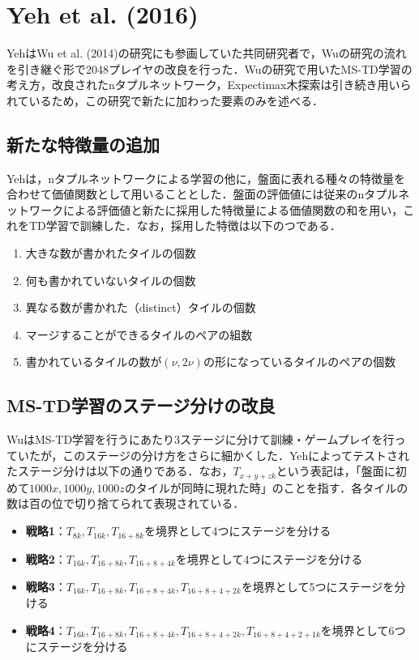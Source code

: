 \documentclass{suribt}
\begin{document}
\section{Yeh et al. (2016)}
YehはWu et al. (2014)の研究にも参画していた共同研究者で，Wuの研究の流れを引き継ぐ形で2048プレイヤの改良を行った．Wuの研究で用いたMS-TD学習の考え方，改良されたnタプルネットワーク，Expectimax木探索は引き続き用いられているため，この研究で新たに加わった要素のみを述べる．

\subsection{新たな特徴量の追加}
Yehは，nタプルネットワークによる学習の他に，盤面に表れる種々の特徴量を合わせて価値関数として用いることとした．盤面の評価値には従来のnタプルネットワークによる評価値と新たに採用した特徴量による価値関数の和を用い，これをTD学習で訓練した．なお，採用した特徴は以下のつである．

\begin{enumerate}
\item 大きな数が書かれたタイルの個数
\item 何も書かれていないタイルの個数
\item 異なる数が書かれた（distinct）タイルの個数
\item マージすることができるタイルのペアの組数
\item 書かれているタイルの数が$({\nu}, 2{\nu})$の形になっているタイルのペアの個数
\end{enumerate}

\subsection{MS-TD学習のステージ分けの改良}
WuはMS-TD学習を行うにあたり3ステージに分けて訓練・ゲームプレイを行っていたが，このステージの分け方をさらに細かくした．Yehによってテストされたステージ分けは以下の通りである．なお，$T_{x+y+zk}$という表記は，「盤面に初めて$1000x, 1000y, 1000z$のタイルが同時に現れた時」のことを指す．各タイルの数は百の位で切り捨てられて表現されている．

\begin{itemize}
\item \textbf{戦略1}：$T_{8k}, T_{16k}, T_{16+8k}$を境界として4つにステージを分ける
\item \textbf{戦略2}：$T_{16k}, T_{16+8k}, T_{16+8+4k}$を境界として4つにステージを分ける
\item \textbf{戦略3}：$T_{16k}, T_{16+8k}, T_{16+8+4k}, T_{16+8+4+2k}$を境界として5つにステージを分ける
\item \textbf{戦略4}：$T_{16k}, T_{16+8k}, T_{16+8+4k}, T_{16+8+4+2k}, T_{16+8+4+2+1k}$を境界として6つにステージを分ける
\end{itemize}
\end{document}
